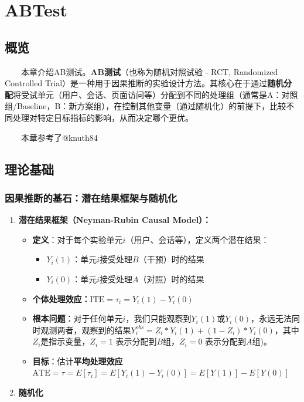 \documentclass[
  letterpaper,
  DIV=11,
  numbers=noendperiod]{scrreprt}
\begin{document}

\chapter{ABTest}\label{abtest}

\section{概览}\label{ux6982ux89c8-1}

  本章介绍AB测试。\textbf{AB测试}（也称为随机对照试验 - RCT, Randomized
Controlled
Trial）是一种用于因果推断的实验设计方法。其核心在于通过\textbf{随机分配}将受试单元（用户、会话、页面访问等）分配到不同的处理组（通常是A：对照组/Baseline，B：新方案组），在控制其他变量（通过随机化）的前提下，比较不同处理对特定目标指标的影响，从而决定哪个更优。

  本章参考了@knuth84

\section{理论基础}\label{ux7406ux8bbaux57faux7840}

\subsection{因果推断的基石：潜在结果框架与随机化}\label{ux56e0ux679cux63a8ux65adux7684ux57faux77f3ux6f5cux5728ux7ed3ux679cux6846ux67b6ux4e0eux968fux673aux5316}

\begin{enumerate}
\def\labelenumi{\arabic{enumi}.}
\item
  \textbf{潜在结果框架（Neyman-Rubin Causal Model）：}

  \begin{itemize}
  \item
    \textbf{定义}：对于每个实验单元\(i\)（用户、会话等），定义两个潜在结果：

    \begin{itemize}
    \item
      \(Y_i(1)\)：单元\(i\)接受处理\(B\)（干预）时的结果
    \item
      \(Y_i(0)\)：单元\(i\)接受处理\(A\)（对照）时的结果
    \end{itemize}
  \item
    \textbf{个体处理效应：}\(\text{ITE} = \tau_i = Y_i(1) - Y_i(0)\)
  \item
    \textbf{根本问题}：对于任何单元\(i\)，我们只能观察到\(Y_i(1)\)或\(Y_i(0)\)，永远无法同时观测两者，观察到的结果\(Y_i^{obs} = Z_i * Y_i(1) + (1 - Z_i) * Y_i(0)\)，其中\(Z_i\)是指示变量，\(Z_i=1\)
    表示分配到\(B\)组，\(Z_i=0\) 表示分配到\(A\)组)。
  \item
    \textbf{目标}：估计\textbf{平均处理效应}\(\text{ATE} = \tau = E[\tau_i] = E[Y_i(1)-Y_i(0)]=E[Y(1)]-E[Y(0)]\)
  \end{itemize}
\item
  \textbf{随机化}
\end{enumerate}
\end{document}
